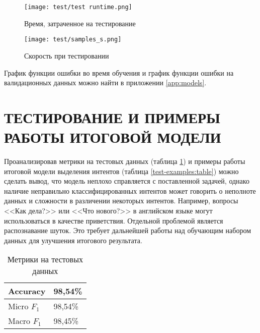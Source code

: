 
\begin{figure}[H]
   \begin{center}
      \texttt{[image: test/test runtime.png]}
      \caption{Время, затраченное на тестирование}
      \label{test-runtime:image}
   \end{center}
\end{figure}

\begin{figure}[H]
   \begin{center}
      \texttt{[image: test/samples\_s.png]}
      \caption{Скорость при тестировании}
      \label{test-samples:image}
   \end{center}
\end{figure}

График функции ошибки во время обучения и график функции ошибки на валидационных данных можно 
найти в приложении \ref{app:models}.

\section{ТЕСТИРОВАНИЕ И ПРИМЕРЫ РАБОТЫ ИТОГОВОЙ МОДЕЛИ}
Проанализировав метрики на тестовых данных (таблица \ref{test-metrics:table}) и примеры работы итоговой модели выделения интентов (таблица \ref{test-examples:table}) можно сделать вывод, что модель неплохо справляется с поставленной задачей, однако наличие неправильно классифицированных интентов может говорить о неполноте данных и сложности в различении некоторых интентов. Например, вопросы <<Как дела?>> или <<Что нового?>> в английском языке могут использоваться в качестве приветствия. Отдельной проблемой является распознавание шуток. Это требует дальнейшей работы над обучающим набором данных для улучшения итогового результата.
\begin{table}[H]
   \captionsetup{format=hang, singlelinecheck=false}
   \raggedleft
      \caption{Метрики на тестовых данных}
      \label{test-metrics:table}
   \centering        
   \begin{tabular}{|p{4cm}|p{4cm}|}
      \hline
      Accuracy & 98,54\% \\
      \hline
      Micro $F_1$ & 98,54\% \\
      \hline
      Macro $F_1$ & 98,45\% \\
      \hline
   \end{tabular}
\end{table}

